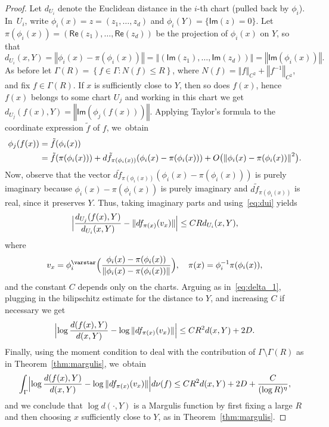 \documentclass[JEP,XML,SOM,Unicode,published]{cedram}
\let\sep :
\newcommand{\set}[1]{\left\{#1\right\}}
\newcommand{\norm}[1]{{\left\Vert#1\right\Vert}}
\newcommand{\anorm}[1]{{\Vert#1\Vert}}
\newcommand{\Babs}[1]{\Bigl\vert#1\Bigr\vert}
\newcommand{\blrpar}[1]{\bigl(#1\bigr)}
\newcommand{\Blrpar}[1]{\Bigl(#1\Bigr)}
\newcommand{\inv}{^{-1}}
\newcommand{\Ima}{{\mathsf{Im}}}
\newcommand{\Rea}{{\mathsf{Re}}}
\theoremstyle{plain}
\theoremstyle{definition}
\begin{document}
\begin{proof}
Let $d_{U_i}$ denote the Euclidean distance in the $i$-th chart (pulled back by $\phi_i$). In~$U_i$, write
$\phi_i(x) = z = (z_1, \ldots, z_d)$ and $\phi_i(Y) = \{\Ima (z) = 0\}$.
Let $\pi(\phi_i(x)) = (\Rea(z_1), \ldots , \Rea(z_d))$ be the projection of $\phi_i(x)$ on $Y$,
so that
\begin{equation} \label{eq:dui}
d_{U_i}(x,Y) = \norm{ \phi_i(x) - \pi(\phi_i(x))} = \norm{(\Ima (z_1), \ldots , \Ima (z_d))} = \norm{\Ima(\phi_i(x))}.
\end{equation}
As before let $\Gamma(R) = \set{f\in \Gamma \sep N(f)\leq R}$, where
$N(f) = \norm{f}_{C^2} + \norm{f\inv}_{C^2}$,
and fix $f\in \Gamma(R)$. If $x$ is sufficiently close to $Y$, then so does $f(x)$, hence
$f(x)$ belongs to some chart $U_j$ and working in this chart we get
$d_{U_j}(f(x),Y) = \norm{\Ima(\phi_j(f(x)))}$.
Applying Taylor's formula to the coordinate expression $\tilde f$ of $f$, we~obtain
\begin{align*}
\notag \phi_j(f(x)) &= \tilde f(\phi_i(x)) \\& \notag = \tilde f (\pi( \phi_i(x))) + d \tilde f_{\pi( \phi_i(x))} (\phi_i(x) - \pi( \phi_i(x)))
+ O\blrpar{ \norm{ \phi_i(x) - \pi(\phi_i(x))}^2}.
\end{align*}
Now, observe that the vector $d \tilde f_{\pi( \phi_i(x))} (\phi_i(x) - \pi( \phi_i(x)))$ is purely imaginary
because $\phi_i(x) - \pi( \phi_i(x))$ is purely imaginary and $d \tilde f_{\pi( \phi_i(x))}$ is real,
since it preserves $Y$.
Thus, taking imaginary parts and using~\eqref{eq:dui} yields
\begin{equation*}
\Babs{ \frac{d_{U_j}(f(x), Y)}{d_{U_i}(x, Y) }- \anorm{df_{\pi( x)}(v_x) }}\leq C R d_{U_i}(x, Y),
\end{equation*}
where
\[
v_x = \phi_i^\varstar\Blrpar{\frac{\phi_i(x) - \pi( \phi_i(x))}{\norm{\phi_i(x) - \pi( \phi_i(x))}}},\quad
\pi(x) = \phi_i\inv \pi( \phi_i(x)),
\]
and the constant $C$ depends only on the charts.
Arguing as in~\eqref{eq:delta_1}, plugging in the bilipschitz estimate for the distance to $Y$, and increasing $C$ if necessary we get
\begin{equation*}
\Babs{\log \frac{d (f(x), Y)}{d (x, Y) }- \log \anorm{df_{\pi( x)}(v_x) }}\leq C R^2 d(x, Y) + 2D.
\end{equation*}
Finally, using the moment condition to deal
with the contribution of $\Gamma\setminus \Gamma(R)$ as in Theorem~\ref{thm:margulis}, we~obtain
\begin{equation*}
\int_\Gamma
\Babs{\log \frac{d(f(x), Y)}{d(x, Y) }- \log \anorm{df_{\pi(x)}(v_x) }} d\nu(f) \leq C R^2 d(x, Y)
+ 2D + \frac{C}{(\log R)^\eta},
\end{equation*}
and we conclude that $\log d(\cdot , Y)$ is a Margulis function by first fixing a large $R$ and then choosing
$x$ sufficiently close to $Y$, as in Theorem~\ref{thm:margulis}.
\end{proof}
\end{document}

